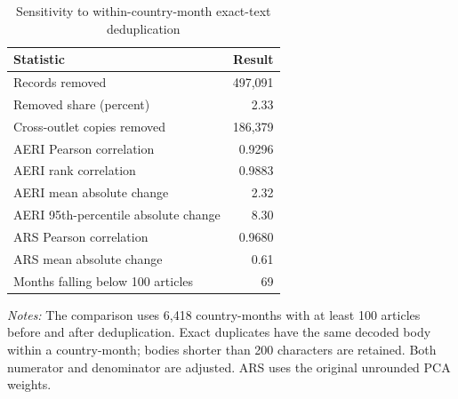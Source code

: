 \begin{table}[htbp]\centering\small
\caption{Sensitivity to within-country-month exact-text deduplication}\label{tab:deduplication}
\begin{tabular}{@{}lr@{}}\toprule Statistic & Result \\\midrule
Records removed & 497,091 \\
Removed share (percent) & 2.33 \\
Cross-outlet copies removed & 186,379 \\
AERI Pearson correlation & 0.9296 \\
AERI rank correlation & 0.9883 \\
AERI mean absolute change & 2.32 \\
AERI 95th-percentile absolute change & 8.30 \\
ARS Pearson correlation & 0.9680 \\
ARS mean absolute change & 0.61 \\
Months falling below 100 articles & 69 \\
\bottomrule\end{tabular}
\begin{singlespace}\footnotesize\textit{Notes:} The comparison uses 6,418 country-months with at least 100 articles before and after deduplication. Exact duplicates have the same decoded body within a country-month; bodies shorter than 200 characters are retained. Both numerator and denominator are adjusted. ARS uses the original unrounded PCA weights.\end{singlespace}\end{table}